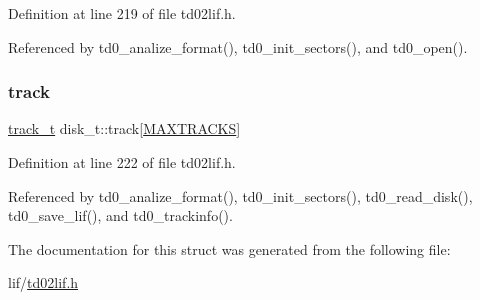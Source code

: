 Definition at line 219 of file td02lif.\+h.



Referenced by td0\+\_\+analize\+\_\+format(), td0\+\_\+init\+\_\+sectors(), and td0\+\_\+open().

\mbox{\label{structdisk__t_a6498dff29cc11a772be6e0cabb54520f}} 
\subsubsection{\texorpdfstring{track}{track}}
{\footnotesize\ttfamily \hyperlink{structtrack__t}{track\+\_\+t} disk\+\_\+t\+::track\mbox{[}\hyperlink{td02lif_8h_ade239296a2facdacc8b64d0791e2d806}{M\+A\+X\+T\+R\+A\+C\+KS}\mbox{]}}



Definition at line 222 of file td02lif.\+h.



Referenced by td0\+\_\+analize\+\_\+format(), td0\+\_\+init\+\_\+sectors(), td0\+\_\+read\+\_\+disk(), td0\+\_\+save\+\_\+lif(), and td0\+\_\+trackinfo().



The documentation for this struct was generated from the following file\+:\begin{DoxyCompactItemize}
\item 
lif/\hyperlink{td02lif_8h}{td02lif.\+h}\end{DoxyCompactItemize}
